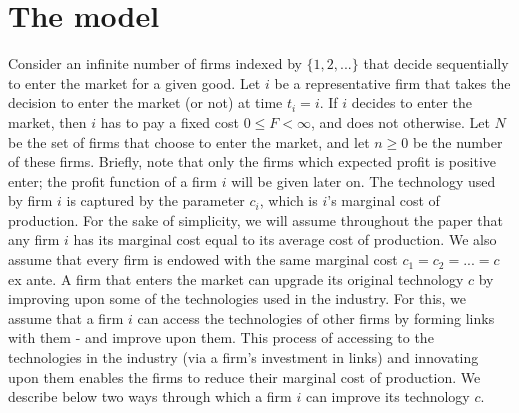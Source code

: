 \documentclass[11pt]{article}
\begin{document}
\section{The model}

\indent Consider an infinite number of firms indexed by $\{1,2,...\}$ that decide sequentially to enter the market for a given good. Let $i$ be a representative firm that takes the decision to enter the market (or not) at time $t_i=i$. If $i$ decides to enter the market, then $i$ has to pay a fixed cost $0\leq F< \infty$, and does not otherwise. Let $N$ be the set of firms that choose to enter the market, and let $n \geq 0$ be the number of these firms. Briefly, note that only the firms which expected profit is positive enter; the profit function of a firm $i$ will be given later on. The technology used by firm $i$ is captured by the parameter $c_i$, which is $i$'s marginal cost of production. For the sake of simplicity, we will assume throughout the paper that any firm $i$ has its marginal cost equal to its average cost of production. We also assume that every firm is endowed with the same marginal cost $c_1=c_2=...=c$ ex ante. A firm that enters the market can upgrade its original technology $c$ by improving upon some of the technologies used in the industry. For this, we assume that a firm $i$ can access the technologies of other firms by forming links with them - and improve upon them. This process of accessing to the technologies in the industry (via a firm's investment in links) and innovating upon them enables the firms to reduce their marginal cost of production. We describe below two ways through which a firm $i$ can improve its technology $c$.\\
\end{document}
